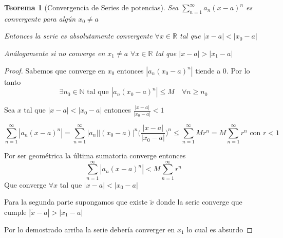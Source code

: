 \documentclass{article}
\theoremstyle{break}
\newtheorem{theorem}{Teorema}[section]
\begin{document}
\begin{theorem}[Convergencia de Series de potencias]
Sea $\sum_{n=1}^{\infty}a_n(x-a)^n$ es convergente para algún $x_0\neq a$ 

Entonces la serie es absolutamente convergente $\forall x \in \mathbb{R}$ tal que $|x-a|<|x_0-a|$

Análogamente si no converge en $x_1\neq a$ $\forall x \in \mathbb{R}$ tal que $|x-a|> |x_1-a|$
\end{theorem}
\begin{proof}
Sabemos que converge en $x_0$ entonces $|a_n(x_0-a)^n|$ tiende a 0. Por lo tanto 
\[\exists n_0 \in \mathbb{N}\text{ tal que }  |a_n(x_0-a)^n| \leq M \quad \forall n \geq n_0\] 

Sea $x$ tal que $ |x-a| < |x_0 -a|$ entonces $\frac{|x-a|}{|x_0-a|} < 1$

\[ \sum_{n=1}^{\infty}|a_n(x-a)^n| =\sum_{n=1}^{\infty}|a_n||(x_0-a)|^n
\bigg (\frac{|x-a|}{|x_0-a|}\bigg)^n \leq \sum_{n=1}^{\infty} M r^n = M \sum_{n=1}^{\infty}r^n\text{ con $r<1$}\]

Por ser geométrica la última sumatoria converge entonces \[ \sum_{n=1}^{\infty}|a_n(x-a)^n| < M \sum_{n=1}^{\infty}r^n \]
Que converge $\forall x$ tal que $|x-a|<|x_0-a|$

Para la segunda parte supongamos que existe $\tilde{x}$ donde la serie converge que cumple $|\tilde{x}-a| > |x_1-a|$ 

Por lo demostrado arriba la serie debería converger en $x_1$ lo cual es absurdo
\end{proof}
\end{document}

